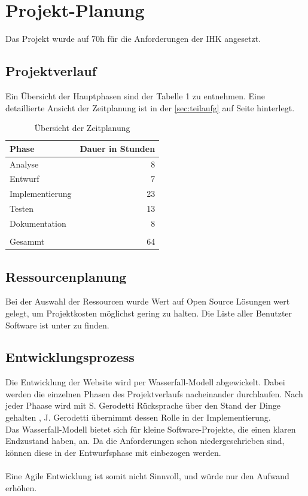 \documentclass[11pt,a4paper]{article}
\begin{document}
\section{Projekt-Planung}
Das Projekt wurde auf 70h für die Anforderungen der IHK angesetzt. 
\subsection{Projektverlauf}
Ein Übersicht der Hauptphasen sind der Tabelle 1 zu entnehmen. Eine detaillierte Ansicht der Zeitplanung ist in der \ref{sec:teilaufg} auf Seite \pageref{sec:teilaufg} hinterlegt.\\
\begin{table}[!ht]
  \centering
     \begin{tabular}{l|r}
       \textbf{Phase}  & \textbf{Dauer in Stunden} \\
       \hline
      Analyse       & 8                     \\
      Entwurf       & 7             	    \\
      Implementierung       & 23	\\
      Testen       & 13			         \\
       Dokumentation      &  8        \\
       \\
       \hline
       \hline
       Gesammt        & 64               \\
     \end{tabular}
     \caption{Übersicht der Zeitplanung}
\label{tbl:Übersicht der Zeitplanung}
\end{table} 
\subsection{Ressourcenplanung}
Bei der Auswahl der Ressourcen wurde Wert auf Open Source Lösungen wert gelegt, um Projektkosten möglichst gering zu halten. Die Liste aller Benutzter Software ist unter %
zu finden.
\subsection{Entwicklungsprozess}
Die Entwicklung der Website wird per Wasserfall-Modell abgewickelt. Dabei werden die einzelnen Phasen des Projektverlaufs nacheinander durchlaufen. Nach jeder Phaase wird mit S. Gerodetti Rücksprache über den Stand der Dinge gehalten , J. Gerodetti übernimmt dessen Rolle in der Implementierung.\\
Das Wasserfall-Modell bietet sich für kleine Software-Projekte, die einen klaren Endzustand haben, an. Da die Anforderungen schon niedergeschrieben sind, können diese in der Entwurfsphase mit einbezogen werden. \\\\
Eine Agile Entwicklung ist somit nicht Sinnvoll, und würde nur den Aufwand erhöhen.
\end{document}
